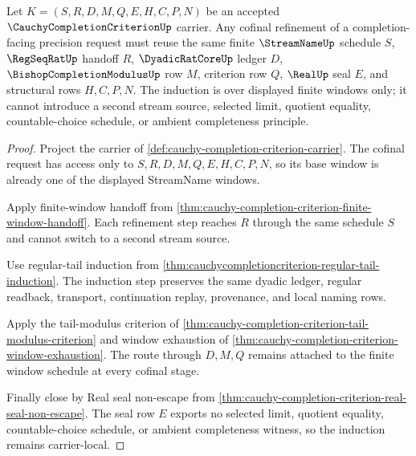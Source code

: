 \begin{theorem}
\label{thm:cauchy-completion-criterion-cofinal-window-induction}
Let $K=(S,R,D,M,Q,E,H,C,P,N)$ be an accepted $\CauchyCompletionCriterionUp$ carrier. Any cofinal refinement of a completion-facing precision request must reuse the same finite $\StreamNameUp$ schedule $S$, $\RegSeqRatUp$ handoff $R$, $\DyadicRatCoreUp$ ledger $D$, $\BishopCompletionModulusUp$ row $M$, criterion row $Q$, $\RealUp$ seal $E$, and structural rows $H,C,P,N$. The induction is over displayed finite windows only; it cannot introduce a second stream source, selected limit, quotient equality, countable-choice schedule, or ambient completeness principle.
\end{theorem}
\begin{proof}
Project the carrier of \autoref{def:cauchy-completion-criterion-carrier}. The cofinal request has access only to $S,R,D,M,Q,E,H,C,P,N$, so its base window is already one of the displayed StreamName windows.

Apply finite-window handoff from \autoref{thm:cauchy-completion-criterion-finite-window-handoff}. Each refinement step reaches $R$ through the same schedule $S$ and cannot switch to a second stream source.

Use regular-tail induction from \autoref{thm:cauchycompletioncriterion-regular-tail-induction}. The induction step preserves the same dyadic ledger, regular readback, transport, continuation replay, provenance, and local naming rows.

Apply the tail-modulus criterion of \autoref{thm:cauchy-completion-criterion-tail-modulus-criterion} and window exhaustion of \autoref{thm:cauchy-completion-criterion-window-exhaustion}. The route through $D,M,Q$ remains attached to the finite window schedule at every cofinal stage.

Finally close by Real seal non-escape from \autoref{thm:cauchy-completion-criterion-real-seal-non-escape}. The seal row $E$ exports no selected limit, quotient equality, countable-choice schedule, or ambient completeness witness, so the induction remains carrier-local.
\end{proof}

